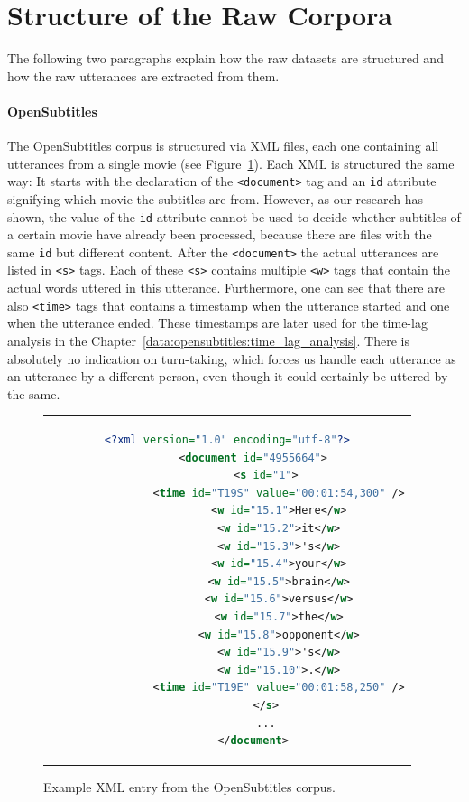 \section{Structure of the Raw Corpora}
\label{data:structure_of_corpora}
The following two paragraphs explain how the raw datasets are structured and how the raw utterances are extracted from them.

\paragraph{OpenSubtitles} The OpenSubtitles corpus is structured via XML files, each one containing all utterances from a single movie (see Figure~\ref{data:opensubtitles:xml_example}). Each XML is structured the same way: It starts with the declaration of the \texttt{<document>} tag and an \texttt{id} attribute signifying which movie the subtitles are from. However, as our research has shown, the value of the \texttt{id} attribute cannot be used to decide whether subtitles of a certain movie have already been processed, because there are files with the same \texttt{id} but different content. After the \texttt{<document>} the actual utterances are listed in \texttt{<s>} tags. Each of these \texttt{<s>} contains multiple \texttt{<w>} tags that contain the actual words uttered in this utterance. Furthermore, one can see that there are also \texttt{<time>} tags that contains a timestamp when the utterance started and one when the utterance ended. These timestamps are later used for the time-lag analysis in the Chapter~\ref{data:opensubtitles:time_lag_analysis}. There is absolutely no indication on turn-taking, which forces us handle each utterance as an utterance by a different person, even though it could certainly be uttered by the same.\\


\begin{figure}[thp]
	\centering
	\begin{tabular}{c}  %
		\begin{lstlisting}[language=XML]
		<?xml version="1.0" encoding="utf-8"?>
		<document id="4955664">
			<s id="1">
				<time id="T19S" value="00:01:54,300" />
				<w id="15.1">Here</w>
				<w id="15.2">it</w>
				<w id="15.3">'s</w>
				<w id="15.4">your</w>
				<w id="15.5">brain</w>
				<w id="15.6">versus</w>
				<w id="15.7">the</w>
				<w id="15.8">opponent</w>
				<w id="15.9">'s</w>
				<w id="15.10">.</w>
				<time id="T19E" value="00:01:58,250" />
			</s>
			...
		</document>
		\end{lstlisting}
	\end{tabular}
	\caption{Example XML entry from the OpenSubtitles corpus.}
	\label{data:opensubtitles:xml_example}
\end{figure}

